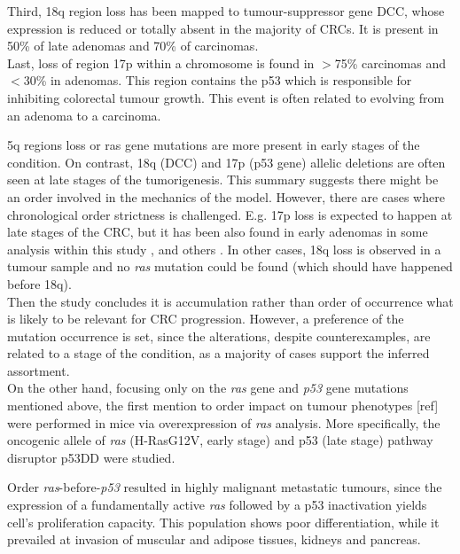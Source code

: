 Third, 18q region loss has been mapped to tumour-suppressor gene DCC, whose expression is reduced or totally absent in the majority of CRCs. It is present in 50\% of late adenomas and 70\% of carcinomas.
\\

Last, loss of region 17p within a chromosome is found in $>$75\% carcinomas and $<$30\% in adenomas. This region contains the p53 which is responsible for inhibiting colorectal tumour growth. This event is often related to evolving from an adenoma to a carcinoma.

5q regions loss or ras gene mutations are more present in early stages of the condition. On contrast, 18q (DCC) and 17p (p53 gene) allelic deletions are often seen at late stages of the tumorigenesis. This summary suggests there might be an order involved in the mechanics of the model. However, there are cases where chronological order strictness is challenged. E.g. 17p loss is expected to happen at late stages of the CRC, but it has been also found in early adenomas in some analysis within this study \cite{Fearon1990ATumorigenesis}, and others \cite{Diep2006TheChanges}. In other cases, 18q loss is observed in a tumour sample and no \textit{ras} mutation could be found (which should have happened before 18q).
\\

Then the study concludes it is accumulation rather than order of occurrence what is likely to be relevant for CRC progression. However, a preference of the mutation occurrence is set, since the alterations, despite counterexamples, are related to a stage of the condition, as a majority of cases support the inferred assortment.
\\

On the other hand, focusing only on the \textit{ras} gene and \textit{p53} gene mutations mentioned above, the first mention to order impact on tumour phenotypes [ref] were performed in mice via overexpression of \textit{ras} analysis. More specifically, the oncogenic allele of \textit{ras} (H-RasG12V, early stage) and p53 (late stage) pathway disruptor p53DD were studied.

Order \textit{ras}-before-\textit{p53} resulted in highly malignant metastatic tumours, since the expression of a fundamentally active \textit{ras} followed by a p53 inactivation yields cell's proliferation capacity. This population shows poor differentiation, while it prevailed at invasion of muscular and adipose tissues, kidneys and pancreas.


